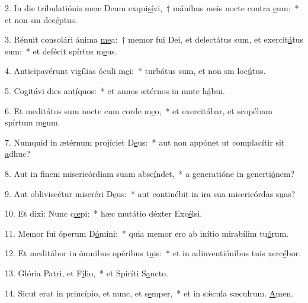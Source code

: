 2. In die tribulatiónis meæ Deum exqui\uline{sí}vi,~† mánibus meis nocte contra \uline{e}um:~* et non sm dec\uline{é}ptus.\par 
3. Rénuit consolári ánima \uline{me}a:~† memor fui Dei, et delectátus sum, et exercit\uline{á}tus sum:~* et defécit spírtus m\uline{e}us.\par 
4. Anticipavérunt vigílias óculi m\uline{e}i:~* turbátus sum, et non sm loc\uline{ú}tus.\par 
5. Cogitávi dies ant\uline{í}quos:~* et annos ætérnos in mnte h\uline{á}bui.\par 
6. Et meditátus sum nocte cum corde m\uline{e}o,~* et exercitábar, et scopébam spírtum m\uline{e}um.\par 
7. Numquid in ætérnum projíciet D\uline{e}us:~* aut non appónet ut complacítir sit \uline{a}dhuc?\par 
8. Aut in finem misericórdiam suam absc\uline{í}ndet,~* a generatióne in generti\uline{ó}nem?\par 
9. Aut obliviscétur miseréri D\uline{e}us:~* aut continébit in ira sua misericórdas s\uline{u}as?\par 
10. Et dixi: Nunc c\uline{œ}pi:~* hæc mutátio déxter Exc\uline{é}lsi.\par 
11. Memor fui óperum D\uline{ó}mini:~* quia memor ero ab inítio mirabílim tu\uline{ó}rum.\par 
12. Et meditábor in ómnibus opéribus t\uline{u}is:~* et in adinventiónibus tuis xerc\uline{é}bor.\par 
13. Glória Patri, et F\uline{í}lio,~* et Spiríti S\uline{a}ncto.\par 
14. Sicut erat in princípio, et nunc, et s\uline{e}mper,~* et in sǽcula sæculrum. \uline{A}men.\par 
